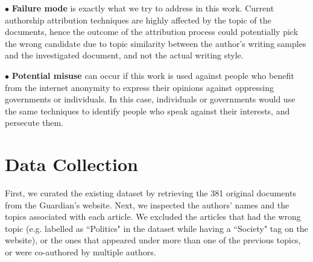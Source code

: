 \documentclass[11pt]{article}
\begin{document}
\noindent$\bullet$ \textbf{Failure mode} is exactly what we try to address in this work. Current authorship attribution techniques are highly affected by the topic of the documents, hence the outcome of the attribution process could potentially pick the wrong candidate due to topic similarity between the author's writing samples and the investigated document, and not the actual writing style. 

\noindent$\bullet$ \textbf{Potential misuse} can occur if this work is used against people who benefit from the internet anonymity to express their opinions against oppressing governments or individuals. In this case, individuals or governments would use the same techniques to identify people who speak against their interests, and persecute them. 
\newpage



\appendix

\onecolumn

\section{Data Collection\label{dataColl}}
First, we curated the existing dataset by retrieving the 381 original documents from the Guardian's website. Next, we inspected the authors' names and the topics associated with each article. We excluded the articles that had the wrong topic (e.g. labelled as ``Politics" in the dataset while having a ``Society" tag on the website), or the ones that appeared under more than one of the previous topics, or were co-authored by multiple authors. 
\end{document}
